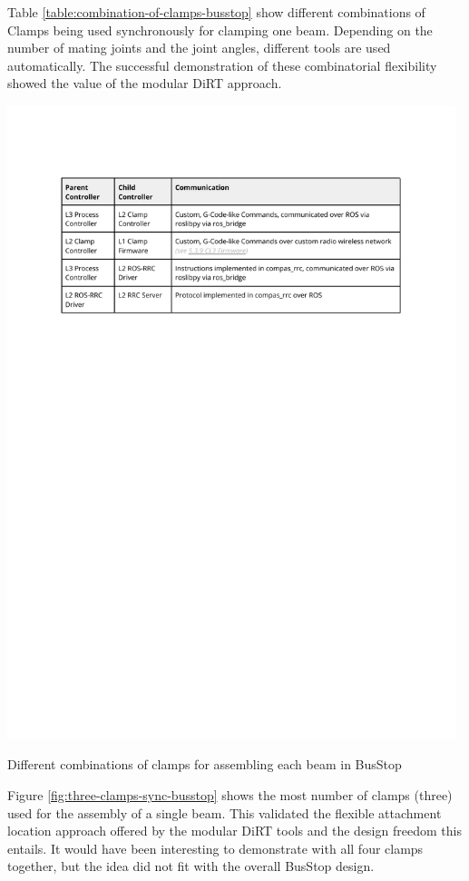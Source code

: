 Table \ref{table:combination-of-clamps-busstop} show different combinations of Clamps being used synchronously for clamping one beam. Depending on the number of mating joints and the joint angles, different tools are used automatically. The successful demonstration of these combinatorial flexibility showed the value of the modular DiRT approach. 

\begin{table}[h!]
    \includegraphics[page=13, trim=25.4mm 182mm 25.4mm 33mm, clip, width=0.98\textwidth]{tables/Tables in Chapter 5.pdf}
    \caption{Different combinations of clamps for assembling each beam in BusStop}
    \label{table:combination-of-clamps-busstop}
\end{table}

Figure \ref{fig:three-clamps-sync-busstop} shows the most number of clamps (three) used for the assembly of a single beam. This validated the flexible attachment location approach offered by the modular DiRT tools and the design freedom this entails. It would have been interesting to demonstrate with all four clamps together, but the idea did not fit with the overall BusStop design.

